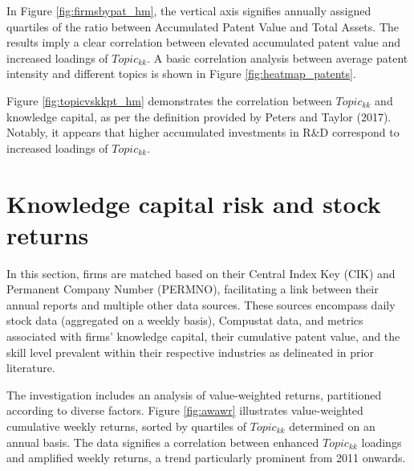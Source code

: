 \documentclass[12pt, letterpaper]{article}
\begin{document}
 In Figure \ref{fig:firmsbypat_hm}, the vertical axis signifies annually assigned quartiles of the ratio between Accumulated Patent Value and Total Assets. The results imply a clear correlation between elevated accumulated patent value and increased loadings of $Topic_{kk}$. A basic correlation analysis between average patent intensity and different topics is shown in Figure \ref{fig:heatmap_patents}.


Figure \ref{fig:topicvskkpt_hm} demonstrates the correlation between $Topic_{kk}$ and knowledge capital, as per the definition provided by Peters and Taylor (2017). Notably, it appears that higher accumulated investments in R\&D correspond to increased loadings of $Topic_{kk}$. 


\section{Knowledge capital risk and stock returns}


In this section, firms are matched based on their Central Index Key (CIK) and Permanent Company Number (PERMNO), facilitating a link between their annual reports and multiple other data sources. These sources encompass daily stock data (aggregated on a weekly basis), Compustat data, and metrics associated with firms' knowledge capital, their cumulative patent value, and the skill level prevalent within their respective industries as delineated in prior literature.

The investigation includes an analysis of value-weighted returns, partitioned according to diverse factors. Figure \ref{fig:awawr} illustrates value-weighted cumulative weekly returns, sorted by quartiles of $Topic_{kk}$ determined on an annual basis. The data signifies a correlation between enhanced $Topic_{kk}$ loadings and amplified weekly returns, a trend particularly prominent from 2011 onwards.

\end{document}
